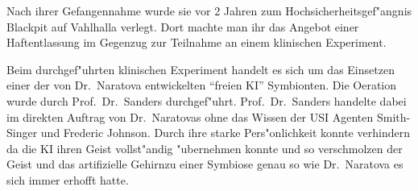 \begin{figure}
    \caption{  }
\end{figure}

Nach ihrer Gefangennahme wurde sie vor 2 Jahren zum Hochsicherheitsgef"angnis Blackpit auf Vahlhalla verlegt. Dort machte man ihr das Angebot einer Haftentlassung im Gegenzug zur Teilnahme an einem klinischen Experiment.

Beim durchgef"uhrten klinischen Experiment handelt es sich um das Einsetzen einer der von Dr.~Naratova entwickelten ``freien KI'' Symbionten. Die Oeration wurde durch Prof.~Dr.~Sanders durchgef"uhrt. Prof.~Dr.~Sanders handelte dabei im direkten Auftrag von Dr.~Naratovas ohne das Wissen der USI Agenten Smith-Singer und Frederic Johnson. Durch ihre starke Pers"onlichkeit konnte   verhindern da\3 die KI ihren Geist vollst"andig "ubernehmen konnte und so verschmolzen der Geist und das artifizielle Gehirnzu einer Symbiose genau so wie Dr.~Naratova es sich immer erhofft hatte.

